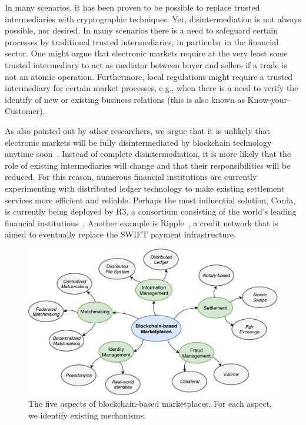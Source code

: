 In many scenarios, it has been proven to be possible to replace trusted intermediaries with cryptographic techniques.
Yet, disintermediation is not always possible, nor desired.
In many scenarios there is a need to safeguard certain processes by traditional trusted intermediaries, in particular in the financial sector.
One might argue that electronic markets require at the very least some trusted intermediary to act as mediator between buyer and sellers if a trade is not an atomic operation.
Furthermore, local regulations might require a trusted intermediary for certain market processes, e.g., when there is a need to verify the identify of new or existing business relations (this is also known as Know-your-Customer).

As also pointed out by other researchers, we argue that it is unlikely that electronic markets will be fully disintermediated by blockchain technology anytime soon~\cite{zamani2018little}.
Instead of complete disintermediation, it is more likely that the role of existing intermediaries will change and that their responsibilities will be reduced.
For this reason, numerous financial institutions are currently experimenting with distributed ledger technology to make existing settlement services more efficient and reliable.
Perhaps the most influential solution, Corda, is currently being deployed by R3, a consortium consisting of the world's leading financial institutions~\cite{brown2016introducing}.
Another example is Ripple~\cite{armknecht2015ripple}, a credit network that is aimed to eventually replace the SWIFT payment infrastructure.

\begin{figure}[t]
	\centering
	\includegraphics[width=\linewidth]{introduction/assets/decomposition}
	\caption{The five aspects of blockchain-based marketplaces. For each aspect, we identify existing mechanisms.}
	\label{fig:electronic_markets}
\end{figure}

